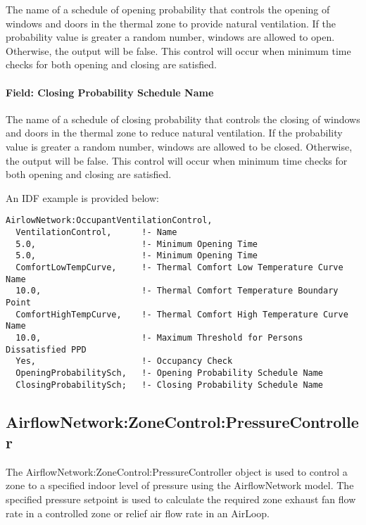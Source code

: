The name of a schedule of opening probability that controls the opening of windows and doors in the thermal zone to provide natural ventilation. If the probability value is greater a random number, windows are allowed to open. Otherwise, the output will be false. This control will occur when minimum time checks for both opening and closing are satisfied.

\paragraph{Field: Closing Probability Schedule Name}\label{field-closing-probability-schedule-name}

The name of a schedule of closing probability that controls the closing of windows and doors in the thermal zone to reduce natural ventilation. If the probability value is greater a random number, windows are allowed to be closed. Otherwise, the output will be false. This control will occur when minimum time checks for both opening and closing are satisfied.

An IDF example is provided below:

\begin{lstlisting}
AirlowNetwork:OccupantVentilationControl,
  VentilationControl,      !- Name
  5.0,                     !- Minimum Opening Time
  5.0,                     !- Minimum Opening Time
  ComfortLowTempCurve,     !- Thermal Comfort Low Temperature Curve Name
  10.0,                    !- Thermal Comfort Temperature Boundary Point
  ComfortHighTempCurve,    !- Thermal Comfort High Temperature Curve Name
  10.0,                    !- Maximum Threshold for Persons Dissatisfied PPD
  Yes,                     !- Occupancy Check
  OpeningProbabilitySch,   !- Opening Probability Schedule Name
  ClosingProbabilitySch;   !- Closing Probability Schedule Name
\end{lstlisting}

\subsection{AirflowNetwork:ZoneControl:PressureController}\label{airflowNetworkzonecontrolpressureoontroller}

The AirflowNetwork:ZoneControl:PressureController object is used to control a zone to a specified indoor level of pressure using the AirflowNetwork model. The specified pressure setpoint is used to calculate the required zone exhaust fan flow rate in a controlled zone or relief air flow rate in an AirLoop.

